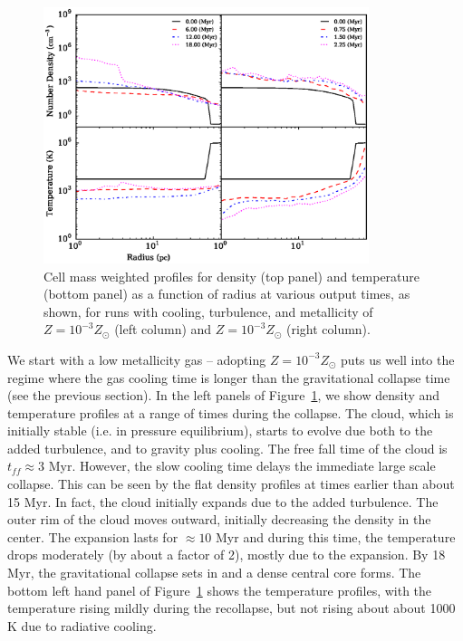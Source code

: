 \documentclass[useAMS,usenatbib]{mn2e}
\begin{document}
\begin{figure}
\begin{center}
\includegraphics[width=9.5cm]{Images/profile_panel}
\end{center}
\caption{\label{fig:profiles} Cell mass weighted profiles for 
density (top panel) and temperature (bottom panel) as a function of radius at various 
output times, as shown, for runs with cooling, turbulence, and metallicity of $Z=10^{-3}Z_\odot$
(left column) and $Z=10^{-3}Z_\odot$ (right column).}
\end{figure}

We start with a low metallicity gas -- adopting $Z=10^{-3}Z_\odot$ puts us well into the regime
where the gas cooling time is longer than the gravitational collapse time (see the previous section).
In the left panels of Figure~\ref{fig:profiles}, we show density and temperature profiles at a range of times during
the collapse.  The cloud, which is initially stable (i.e. in pressure equilibrium), starts to evolve due both to the added
turbulence, and to gravity plus cooling. The free fall time of the cloud is $t_{ff}\approx 3$
Myr. However, the slow cooling time delays the immediate large scale collapse.
This can be seen by the flat density profiles at times earlier than about 15 Myr. 
In fact, the cloud initially expands due to the added turbulence. The outer rim
of the cloud moves outward, initially decreasing the density in the center.
The expansion lasts for $\approx 10$ Myr and during this time, the temperature drops moderately
(by about a factor of 2), mostly due to the expansion.  By 18 Myr, the gravitational
collapse sets in and a dense central core forms.   The bottom left hand panel of Figure~\ref{fig:profiles}
shows the temperature profiles, with the temperature rising mildly during the recollapse, but
not rising about about 1000 K due to radiative cooling.
\end{document}
